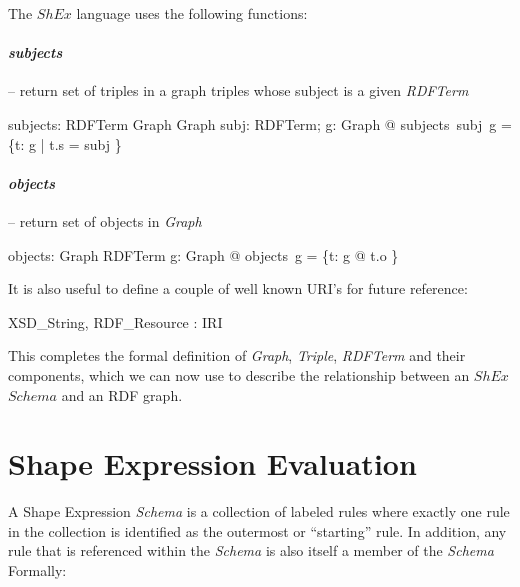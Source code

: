 \documentclass[fuzz]{llncs}
\def\zc{\textit}
\begin{document}
The $ShEx$ language uses the following functions:

\paragraph{\zc{subjects}} -- return set of triples in a graph triples whose subject is a given \zc{RDFTerm}
\begin{gendef}
   subjects: RDFTerm \fun Graph \fun Graph
\where
   \forall subj: RDFTerm; g: Graph @ subjects~subj~g = \{t: g | t.s = subj \}
\end{gendef}

\paragraph{\zc{objects}} -- return set of objects in \zc{Graph}
\begin{gendef}
   objects: Graph \fun \power RDFTerm
\where
   \forall g: Graph @ objects~g = \{t: g @ t.o \}
\end{gendef}

It is also useful to define a couple of well known URI's for future reference:

\begin{axdef}
XSD\_String, RDF\_Resource : IRI
\end{axdef}

This completes the formal definition of \zc{Graph}, \zc{Triple}, \zc{RDFTerm} and their components, which we can now use to describe the relationship between an $ShEx$ $Schema$ and an RDF graph.

\section{Shape Expression Evaluation}
A Shape Expression \zc{Schema} is a collection of labeled rules where exactly one rule in the collection is identified as the outermost or ``starting'' rule. In addition, any rule 
that is referenced within the \zc{Schema} is also itself a member of the \zc{Schema} Formally:
\end{document}
